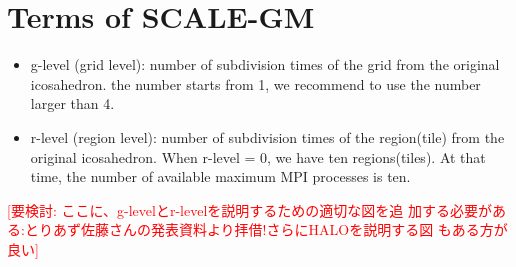 \section{Terms of SCALE-GM}

 \begin{itemize}
   \item g-level (grid level): number of subdivision times of the grid from the original icosahedron.
         the number starts from 1, we recommend to use the number larger than 4.
   \item r-level (region level): number of subdivision times of the region(tile)
         from the original icosahedron. When r-level = 0, we have ten regions(tiles).
         At that time, the number of available maximum MPI processes is ten.
 \end{itemize}



\textcolor{red}{[要検討: ここに、g-levelとr-levelを説明するための適切な図を追
    加する必要がある:とりあず佐藤さんの発表資料より拝借!さらにHALOを説明する図
    もある方が良い]}

